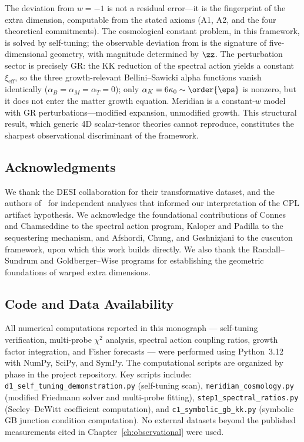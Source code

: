 The deviation from $w = -1$ is not a residual error---it is the fingerprint of the extra dimension, computable from the stated axioms (A1, A2, and the four theoretical commitments). The cosmological constant problem, in this framework, is solved by self-tuning; the observable deviation from \LCDM{} is the signature of five-dimensional geometry, with magnitude determined by $\zz$. The perturbation sector is precisely GR: the KK reduction of the spectral action yields a constant $\xi_{\mathrm{eff}}$, so the three growth-relevant Bellini--Sawicki alpha functions vanish identically ($\alpha_B = \alpha_M = \alpha_T = 0$); only $\alpha_K = 6\kappa_0 \sim \order{\eps}$ is nonzero, but it does not enter the matter growth equation. Meridian is a constant-$w$ model with GR perturbations---modified expansion, unmodified growth. This structural result, which generic 4D scalar-tensor theories cannot reproduce, constitutes the sharpest observational discriminant of the framework.

\bigskip

\subsection*{Acknowledgments}

We thank the DESI collaboration for their transformative dataset, and the authors of~\cite{ch1:nesseris25,ch1:gomez25,ch1:lodha24,ch1:hasan25,ch1:mandal25,ch1:andrianomena25,ch1:marques25} for independent analyses that informed our interpretation of the CPL artifact hypothesis. We acknowledge the foundational contributions of Connes and Chamseddine to the spectral action program, Kaloper and Padilla to the sequestering mechanism, and Afshordi, Chung, and Geshnizjani to the cuscuton framework, upon which this work builds directly. We also thank the Randall--Sundrum and Goldberger--Wise programs for establishing the geometric foundations of warped extra dimensions.

\subsection*{Code and Data Availability}

All numerical computations reported in this monograph --- self-tuning verification, multi-probe $\chi^2$ analysis, spectral action coupling ratios, growth factor integration, and Fisher forecasts --- were performed using Python~3.12 with NumPy, SciPy, and SymPy. The computational scripts are organized by phase in the project repository. Key scripts include: \texttt{d1\_self\_tuning\_demonstration.py} (self-tuning scan), \texttt{meridian\_cosmology.py} (modified Friedmann solver and multi-probe fitting), \texttt{step1\_spectral\_ratios.py} (Seeley--DeWitt coefficient computation), and \texttt{c1\_symbolic\_gb\_kk.py} (symbolic GB junction condition computation). No external datasets beyond the published measurements cited in Chapter~\ref{ch:observational} were used.

